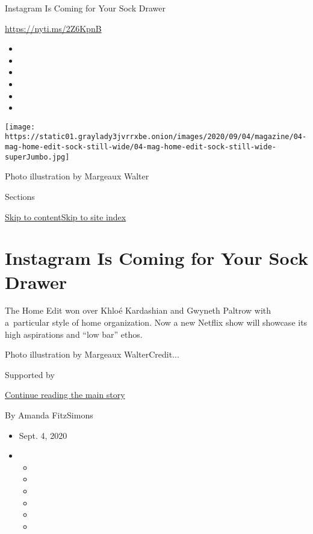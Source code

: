 Instagram Is Coming for Your Sock Drawer

\url{https://nyti.ms/2Z6KpnB}

\begin{itemize}
\item
\item
\item
\item
\item
\item
\end{itemize}

\texttt{[image: https://static01.graylady3jvrrxbe.onion/images/2020/09/04/magazine/04-mag-home-edit-sock-still-wide/04-mag-home-edit-sock-still-wide-superJumbo.jpg]}

Photo illustration by Margeaux Walter

Sections

\protect\hyperlink{site-content}{Skip to
content}\protect\hyperlink{site-index}{Skip to site index}

\hypertarget{instagram-is-coming-for-your-sock-drawer}{%
\section{Instagram Is Coming for Your Sock
Drawer}\label{instagram-is-coming-for-your-sock-drawer}}

The Home Edit won over Khloé Kardashian and Gwyneth Paltrow with
a~particular style of home organization. Now a new Netflix show will
showcase its high aspirations and ``low bar'' ethos.

Photo illustration by Margeaux WalterCredit...

Supported by

\protect\hyperlink{after-sponsor}{Continue reading the main story}

By Amanda FitzSimons

\begin{itemize}
\item
  Sept. 4, 2020
\item
  \begin{itemize}
  \item
  \item
  \item
  \item
  \item
  \item
  \end{itemize}
\end{itemize}

